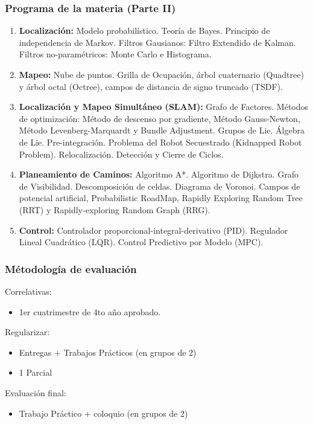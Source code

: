 \begin{frame}
	\frametitle{Programa de la materia (Parte II)}
	\footnotesize
	\begin{enumerate}

		\item {\bf Localización:} Modelo probabilístico. Teoría de Bayes. Principio de independencia de Markov. Filtros Gausianos: Filtro Extendido de Kalman. Filtros no-paramétricos: Monte Carlo e Histograma.

		\item {\bf Mapeo:} Nube de puntos. Grilla de Ocupación, árbol cuaternario (Quadtree) y árbol octal (Octree), campos de distancia de signo truncado (TSDF).
		
		\item {\bf Localización y Mapeo Simultáneo (SLAM):} Grafo de Factores. Métodos de optimización: Método de descenso por gradiente, Método Gauss-Newton, Método Levenberg-Marquardt y Bundle Adjustment. Grupos de Lie. Álgebra de Lie. Pre-integración. Problema del Robot Secuestrado (Kidnapped Robot Problem). Relocalización. Detección y Cierre de Ciclos.
		
		\item {\bf Planeamiento de Caminos:} Algoritmo A*. Algoritmo de Dijkstra. Grafo de Visibilidad. Descomposición de celdas. Diagrama de Voronoi. Campos de potencial artificial, Probabilistic RoadMap, Rapidly Exploring Random Tree (RRT) y Rapidly-exploring Random Graph (RRG).
		
		\item {\bf Control:} Controlador proporcional-integral-derivativo (PID). Regulador Lineal Cuadrático (LQR). Control Predictivo por Modelo (MPC).
		
	\end{enumerate}

\end{frame}

\begin{frame}
	\frametitle{Métodología de evaluación}
	
	Correlativas:
	\begin{itemize}
		\item 1er cuatrimestre de 4to año aprobado.
	\end{itemize}

	
	Regularizar:
	\begin{itemize}
		\item Entregas + Trabajos Prácticos (en grupos de 2)
		\item 1 Parcial
	\end{itemize}

	Evaluación final:
	\begin{itemize}
		\item Trabajo Práctico + coloquio (en grupos de 2)
	\end{itemize}	
\end{frame}